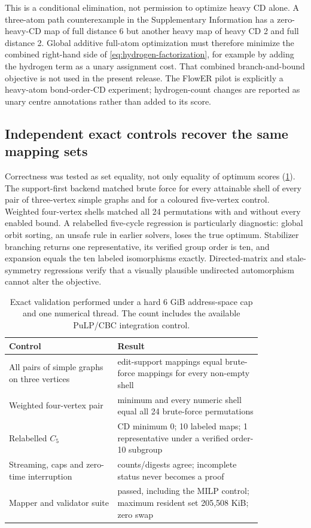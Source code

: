\documentclass[11pt]{article}
\begin{document}
This is a conditional elimination, not permission to optimize heavy CD alone.
A three-atom path counterexample in the Supplementary Information has a
zero-heavy-CD map of full distance 6 but another heavy map of heavy CD 2 and
full distance 2.  Global additive full-atom optimization must therefore
minimize the combined right-hand side of
\cref{eq:hydrogen-factorization}, for example by adding the hydrogen term as a
unary assignment cost.  That combined branch-and-bound objective is not used
in the present release.  The FlowER pilot is explicitly a heavy-atom
bond-order-CD experiment; hydrogen-count changes are reported as unary centre
annotations rather than added to its score.

\subsection*{Independent exact controls recover the same mapping sets}

Correctness was tested as set equality, not only equality of optimum scores
(\cref{tab:validation}).  The support-first backend matched brute force for
every attainable shell of every pair of three-vertex simple graphs and for a
coloured five-vertex control.  Weighted four-vertex shells matched all 24
permutations with and without every enabled bound.  A relabelled five-cycle
regression is particularly diagnostic: global orbit sorting, an unsafe rule
in earlier solvers, loses the true optimum.  Stabilizer branching returns one
representative, its verified group order is ten, and expansion equals the ten
labeled isomorphisms exactly.  Directed-matrix and stale-symmetry regressions
verify that a visually plausible undirected automorphism cannot alter the
objective.

\begin{table}[t]
\centering
\caption{Exact validation performed under a hard 6 GiB address-space cap and
one numerical thread.  The count includes the available PuLP/CBC integration
control.}
\label{tab:validation}
\begin{tabular}{>{\raggedright\arraybackslash}p{0.36\linewidth}
                >{\raggedright\arraybackslash}p{0.48\linewidth}}
\toprule
Control & Result \\
\midrule
All pairs of simple graphs on three vertices & edit-support mappings equal
brute-force mappings for every non-empty shell \\
Weighted four-vertex pair & minimum and every numeric shell equal all 24
brute-force permutations \\
Relabelled $C_5$ & CD minimum 0; 10 labeled maps; 1 representative under a
verified order-10 subgroup \\
Streaming, caps and zero-time interruption & counts/digests agree; incomplete
status never becomes a proof \\
Mapper and validator suite & 102 passed, including the MILP control; maximum
resident set 205,508 KiB; zero swap \\
\bottomrule
\end{tabular}
\end{table}
\end{document}

